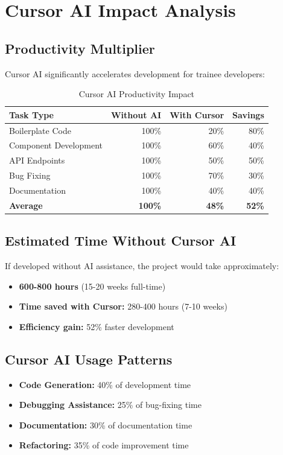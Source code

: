 \documentclass[11pt,a4paper]{article}
\begin{document}
\newpage

\section{Cursor AI Impact Analysis}

\subsection{Productivity Multiplier}
Cursor AI significantly accelerates development for trainee developers:

\begin{table}[h]
\centering
\begin{tabular}{lrrr}
\toprule
\textbf{Task Type} & \textbf{Without AI} & \textbf{With Cursor} & \textbf{Savings} \\
\midrule
Boilerplate Code & 100\% & 20\% & 80\% \\
Component Development & 100\% & 60\% & 40\% \\
API Endpoints & 100\% & 50\% & 50\% \\
Bug Fixing & 100\% & 70\% & 30\% \\
Documentation & 100\% & 40\% & 40\% \\
\bottomrule
\textbf{Average} & \textbf{100\%} & \textbf{48\%} & \textbf{52\%} \\
\bottomrule
\end{tabular}
\caption{Cursor AI Productivity Impact}
\end{table}

\subsection{Estimated Time Without Cursor AI}
If developed without AI assistance, the project would take approximately:
\begin{itemize}
    \item \textbf{600-800 hours} (15-20 weeks full-time)
    \item \textbf{Time saved with Cursor:} 280-400 hours (7-10 weeks)
    \item \textbf{Efficiency gain:} 52\% faster development
\end{itemize}

\subsection{Cursor AI Usage Patterns}
\begin{itemize}
    \item \textbf{Code Generation:} 40\% of development time
    \item \textbf{Debugging Assistance:} 25\% of bug-fixing time
    \item \textbf{Documentation:} 30\% of documentation time
    \item \textbf{Refactoring:} 35\% of code improvement time
\end{itemize}
\end{document}
